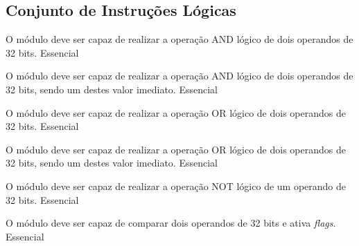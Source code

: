 \subsection{Conjunto de Instruções Lógicas} 
  
    \begin{functional}
    
      {O módulo deve ser capaz de realizar a operação AND lógico de dois operandos de 32 bits.}
      {Essencial}
      
      {O módulo deve ser capaz de realizar a operação AND lógico de dois operandos de 32 bits, sendo um destes valor imediato.}
      {Essencial}

      {O módulo deve ser capaz de realizar a operação OR lógico de dois operandos de 32 bits.}
      {Essencial}  
      
      {O módulo deve ser capaz de realizar a operação OR lógico de dois operandos de 32 bits, sendo um destes valor imediato.}
      {Essencial} 
      
      {O módulo deve ser capaz de realizar a operação NOT lógico de um operando de 32 bits.}
      {Essencial}   
      
      {O módulo deve ser capaz de comparar dois operandos de 32 bits e ativa \textit{flags}.}
      {Essencial}
      
      
      
      
    \end{functional}